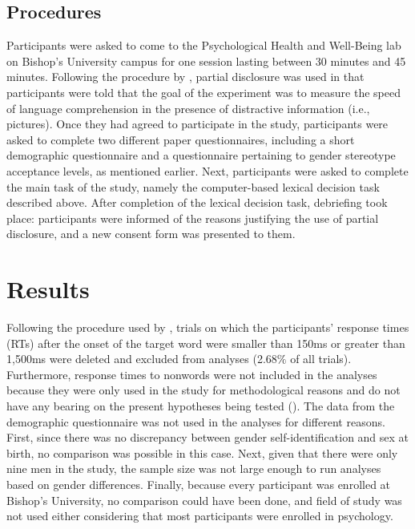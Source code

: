 \documentclass[serif, twocolumn, numeric, empirical]{jote-article}
\begin{document}
{}
\subsection*{Procedures}
Participants were asked to come to the Psychological Health and Well-Being lab on Bishop’s University campus for one session lasting between 30 minutes and 45 minutes. Following the procedure by \textcite{BartholowHeinz2006}, partial disclosure was used in that participants were told that the goal of the experiment was to measure the speed of language comprehension in the presence of distractive information (i.e., pictures). Once they had agreed to participate in the study, participants were asked to complete two different paper questionnaires, including a short demographic questionnaire and a questionnaire pertaining to gender stereotype acceptance levels, as mentioned earlier. Next, participants were asked to complete the main task of the study, namely the computer-based lexical decision task described above. After completion of the lexical decision task, debriefing took place: participants were informed of the reasons justifying the use of partial disclosure, and a new consent form was presented to them. 


{}
\section*{Results} %
\label{sec:results}

Following the procedure used by \textcite{BartholowHeinz2006}, trials on which the participants’ response times (RTs) after the onset of the target word were smaller than 150ms or greater than 1,500ms were deleted and excluded from analyses (2.68$\%$  of all trials). Furthermore, response times to nonwords were not included in the analyses because they were only used in the study for methodological reasons and do not have any bearing on the present hypotheses being tested (\cite{BartholowHeinz2006}). The data from the demographic questionnaire was not used in the analyses for different reasons. First, since there was no discrepancy between gender self-identification and sex at birth, no comparison was possible in this case. Next, given that there were only nine men in the study, the sample size was not large enough to run analyses based on gender differences. Finally, because every participant was enrolled at Bishop’s University, no comparison could have been done, and field of study was not used either considering that most participants were enrolled in psychology. 
\end{document}
